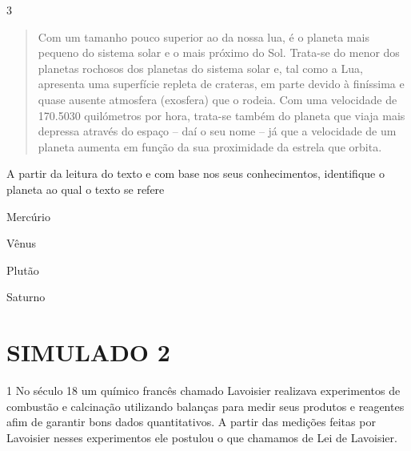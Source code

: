 \num{3}
\begin{quote}
  Com um tamanho pouco superior ao da nossa lua, é o planeta mais
  pequeno do sistema solar e o mais próximo do Sol. Trata-se do menor
  dos planetas rochosos dos planetas do sistema solar e, tal como a Lua,
  apresenta uma superfície repleta de crateras, em parte devido à
  finíssima e quase ausente atmosfera (exosfera) que o rodeia. Com uma
  velocidade de 170.5030 quilómetros por hora, trata-se também do
  planeta que viaja mais depressa através do espaço -- daí o seu nome --
  já que a velocidade de um planeta aumenta em função da sua proximidade
  da estrela que orbita.

\end{quote}

A partir da leitura do texto e com base nos seus conhecimentos,
identifique o planeta ao qual o texto se refere

\begin{escolha}
\item
  Mercúrio
\item
  Vênus
\item
  Plutão
\item
  Saturno
\end{escolha}


\chapter{SIMULADO 2}

\num{1}
  No século 18 um químico francês chamado Lavoisier realizava
  experimentos de combustão e calcinação utilizando balanças para medir
  seus produtos e reagentes afim de garantir bons dados quantitativos. A
  partir das medições feitas por Lavoisier nesses experimentos ele
  postulou o que chamamos de Lei de Lavoisier.

